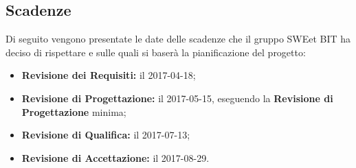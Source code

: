 \subsection{Scadenze}
Di seguito vengono presentate le date delle scadenze che il gruppo SWEet BIT ha deciso di rispettare e sulle quali si baserà la pianificazione del progetto: \\
\begin{itemize}
	\item \textbf{Revisione dei Requisiti:} il 2017-04-18;
	\item \textbf{Revisione di Progettazione:} il 2017-05-15, eseguendo la \textbf{Revisione di Progettazione} minima;
	\item \textbf{Revisione di Qualifica:} il 2017-07-13;
	\item \textbf{Revisione di Accettazione:} il 2017-08-29.
\end{itemize}